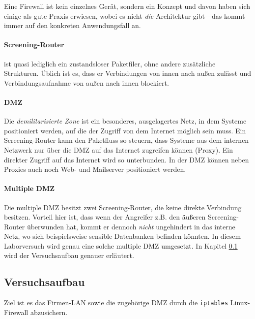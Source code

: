 Eine Firewall ist kein einzelnes Gerät, sondern ein Konzept und davon
haben sich einige als gute Praxis erwiesen, wobei es nicht \emph{die}
Architektur gibt---das kommt immer auf den konkreten Anwendungsfall an.

\paragraph{Screening-Router} ist quasi lediglich ein zustandsloser
Paketfiler, ohne andere zusätzliche Strukturen. Üblich ist es, dass er
Verbindungen von innen nach außen zulässt und Verbindungsaufnahme von
außen nach innen blockiert.\cite{iptables}

\paragraph{DMZ}
Die \emph{demilitarisierte Zone} ist ein besonderes, ausgelagertes Netz,
in dem Systeme positioniert werden, auf die der Zugriff von dem Internet
möglich sein muss. Ein Screening-Router kann den Paketfluss so steuern,
dass Systeme aus dem internen Netzwerk nur über die DMZ auf das Internet
zugreifen können (Proxy). Ein direkter Zugriff auf das Internet wird so
unterbunden. In der DMZ können neben Proxies auch noch Web- und Mailserver
positioniert werden.\cite{iptables}

\paragraph{Multiple DMZ} Die multiple DMZ besitzt zwei Screening-Router,
die keine direkte Verbindung besitzen. Vorteil hier ist, dass wenn der
Angreifer z.B. den äußeren Screening-Router überwunden hat, kommt er dennoch
\emph{nicht} ungehindert in das interne Netz, wo sich beispielsweise
sensible Datenbanken befinden könnten.\cite{iptables}
In diesem Laborversuch wird genau eine solche multiple DMZ umgesetzt.
In Kapitel \ref{sec.aufbau} wird der Versuchsaufbau genauer erläutert.


\subsection{Versuchsaufbau}\label{sec.aufbau}

Ziel ist es das Firmen-LAN sowie die zugehörige DMZ durch die
{\tt iptables} Linux-Firewall abzusichern.

